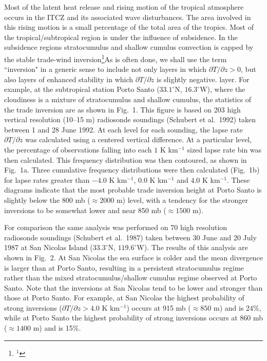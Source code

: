      Most of the latent heat release and rising motion of the tropical
atmosphere occurs in the ITCZ and its associated wave disturbances.  The area
involved in this rising motion is a small percentage of the total area of the
tropics.  Most of the tropical/subtropical region is under the influence of
subsidence.  In the subsidence regions stratocumulus and shallow cumulus
convection is capped by the stable trade-wind inversion\footnote{$^1$}{As is
often done, we shall use the term ``inversion" in a generic sense to include
not only layers in which $\partial T/\partial z > 0$, but also layers of
enhanced stability in which $\partial T/\partial z$ is slightly negative.}
layer.  For example, at the subtropical station Porto Santo ($33.1^\circ$N,
$16.3^\circ$W), where the cloudiness is a mixture of stratocumulus and shallow
cumulus, the statistics of the trade inversion are as shown in Fig.~1.  This
figure is based on 203 high vertical resolution (10--15 m) radiosonde
soundings (Schubert et al.\ 1992)
taken between 1 and 28 June 1992.  At each level for each sounding, the lapse
rate $\partial T/\partial z$ was calculated using a centered vertical
difference.  At a particular level, the percentage of observations falling
into each $1$ K km$^{-1}$ sized lapse rate bin was then calculated.  This
frequency distribution was then contoured, as shown in Fig.~1a.  Three
cumulative frequency distributions were then calculated (Fig.~1b) for lapse
rates greater than $-4.0$ K km$^{-1}$,
$0.0$ K km$^{-1}$ and $4.0$ K km$^{-1}$.  These diagrams indicate that the
most probable trade inversion height at Porto Santo is slightly below the 800
mb ($\approx 2000$ m)  level, with a tendency for the stronger inversions to
be somewhat lower and near 850 mb ($\approx 1500$ m).

     For comparison the same analysis was performed on 70 high resolution
radiosonde soundings (Schubert et al.\ 1987) taken between 30 June and 20 July
1987 at San Nicolas Island ($33.3^\circ$N, $119.6^\circ$W).  The results of
this analysis are shown in Fig.~2.  At San Nicolas the sea surface is colder
and the mean divergence is larger than at Porto Santo, resulting in a
persistent stratocumulus regime rather than the mixed stratocumulus/shallow
cumulus regime observed at Porto Santo.  Note that the inversions at San
Nicolas tend to be lower and stronger than those at Porto Santo.  For example,
at San Nicolas the highest probability of strong inversions
($\partial T/\partial z > 4.0$ K km$^{-1}$) occurs at 915 mb ($\approx 850$ m)
and is 24\%, while at Porto Santo the highest probability of strong inversions
occurs at 860 mb ($\approx 1400$ m) and is 15\%.

